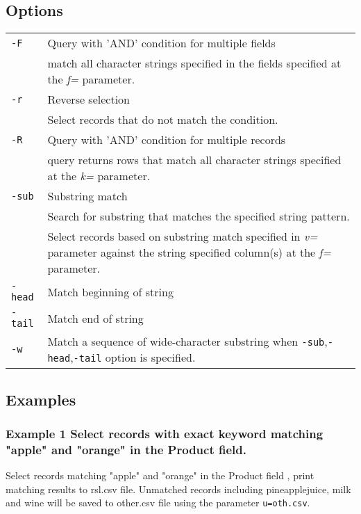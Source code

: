 \documentclass[a4paper]{jarticle}
\begin{document}
\subsection*{Options}
\begin{table}[htbp]
{\small
\begin{tabular}{ll}
\verb|-F|    &  Query with 'AND' condition for multiple fields  \\
& match all character strings specified in the fields specified at the \emph{f=} parameter. \\
\verb|-r|    & Reverse selection \\
& Select records that do not match the condition. \\
\verb|-R|    & Query with 'AND' condition for multiple records \\
&  query returns rows that match all character strings specified at the \emph{k=} parameter. \\
\verb|-sub|  & Substring match  \\
& Search for substring that matches the specified string pattern.  \\
& Select records based on substring match specified in \emph{v=} parameter against the string specified column(s) at the \emph{f=} parameter. \\
\verb|-head| & Match beginning of string \\
\verb|-tail| & Match end of string  \\
\verb|-w|    & Match a sequence of wide-character substring when \verb|-sub|,\verb|-head|,\verb|-tail| option is specified. \\
\end{tabular} 
}
\end{table} 


\newpage
\subsection*{Examples}
\subsubsection*{Example 1 Select records with exact keyword matching "apple" and "orange" in the Product field. }
Select records matching "apple" and "orange" in the Product field , print matching results to rsl.csv file. Unmatched records including pineapplejuice, milk and wine will be saved to other.csv file using the parameter \verb|u=oth.csv|. 
\end{document}
